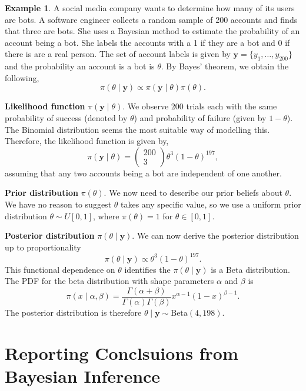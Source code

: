 \documentclass[
]{book}
\theoremstyle{definition}
\theoremstyle{definition}
\newtheorem{example}{Example}[chapter]
\theoremstyle{definition}
\theoremstyle{definition}
\theoremstyle{remark}
\begin{document}
\begin{example}
\protect\hypertarget{exm:binom}{}\label{exm:binom}A social media company wants to determine how many of its users are bots. A software engineer collects a random sample of 200 accounts and finds that three are bots. She uses a Bayesian method to estimate the probability of an account being a bot. She labels the accounts with a 1 if they are a bot and 0 if there is are a real person. The set of account labels is given by \(\boldsymbol{y} = \{y_1, \ldots, y_{200}\}\) and the probability an account is a bot is \(\theta\). By Bayes' theorem, we obtain the following,
\[
\pi(\theta \mid \boldsymbol{y}) \propto \pi(\boldsymbol{y}\mid \theta) \pi(\theta).
\]

\textbf{Likelihood function} \(\pi(\boldsymbol{y}\mid \theta)\). We observe 200 trials each with the same probability of success (denoted by \(\theta\)) and probability of failure (given by \(1-\theta\)). The Binomial distribution seems the most suitable way of modelling this. Therefore, the likelihood function is given by,
\[
\pi(\boldsymbol{y}\mid \theta) = \begin{pmatrix} 200 \\ 3 \end{pmatrix} \theta^3(1-\theta)^{197},
\]
assuming that any two accounts being a bot are independent of one another.

\textbf{Prior distribution} \(\pi(\theta)\). We now need to describe our prior beliefs about \(\theta\). We have no reason to suggest \(\theta\) takes any specific value, so we use a uniform prior distribution \(\theta \sim U[0, 1]\), where \(\pi(\theta) = 1\) for \(\theta \in [0, 1]\).

\textbf{Posterior distribution} \(\pi(\theta \mid \boldsymbol{y})\). We can now derive the posterior distribution up to proportionality
\[
\pi(\theta \mid \boldsymbol{y}) \propto \theta^3(1-\theta)^{197}. 
\]
This functional dependence on \(\theta\) identifies the \(\pi(\theta \mid \boldsymbol{y})\) is a Beta distribution. The PDF for the beta distribution with shape parameters \(\alpha\) and \(\beta\) is
\[
\pi(x \mid \alpha, \beta) = \frac{\Gamma(\alpha + \beta)}{\Gamma(\alpha)\Gamma(\beta)}x^{\alpha - 1}(1-x)^{\beta - 1}. 
\]
The posterior distribution is therefore \(\theta \mid \boldsymbol{y} \sim \textrm{Beta}(4, 198)\).
\end{example}

\hypertarget{reporting-conclsuions-from-bayesian-inference}{%
\section{Reporting Conclsuions from Bayesian Inference}\label{reporting-conclsuions-from-bayesian-inference}}
\end{document}
